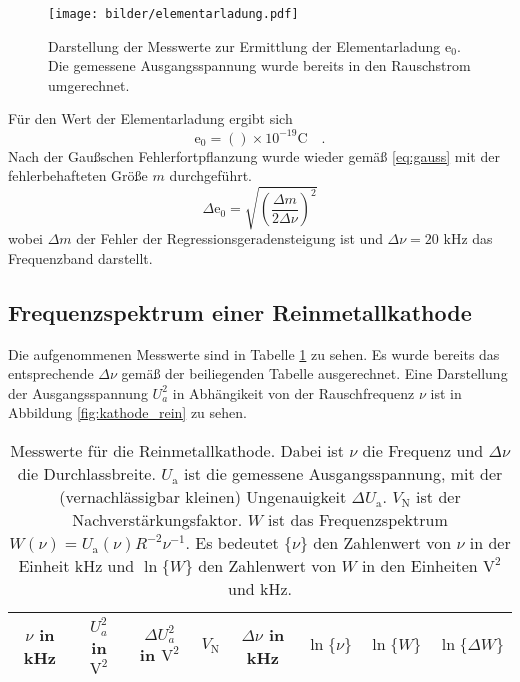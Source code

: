 	\begin{figure}
		\centering
		\texttt{[image: bilder/elementarladung.pdf]}
		\caption{Darstellung der Messwerte zur Ermittlung der
		Elementarladung $\text{e}_0$. Die gemessene Ausgangsspannung
		wurde bereits in den Rauschstrom umgerechnet.}
		\label{fig:elementarladung}
	\end{figure}

	Für den Wert der Elementarladung ergibt sich
	\begin{equation}
	\text{e}_0 = () \times
				10^{-19}\text{C} \quad .
	\end{equation}
	Nach der Gaußschen Fehlerfortpflanzung wurde wieder gemäß \eqref{eq:gauss} mit der
	fehlerbehafteten Größe $m$ durchgeführt.
	\begin{equation}
	\Delta \text{e}_0 = \sqrt{\left( \frac{\Delta m}{2 \Delta \nu} \right)^2}
	\end{equation}
	wobei $\Delta m$ der Fehler der Regressionsgeradensteigung ist und
	$\Delta \nu=20\text{ kHz}$ das Frequenzband darstellt.

\clearpage
\subsection{Frequenzspektrum einer Reinmetallkathode}

	Die aufgenommenen Messwerte sind in Tabelle
	\ref{tab:kathode_rein} zu sehen. Es wurde bereits das
	entsprechende $\Delta \nu$ gemäß der beiliegenden Tabelle
	ausgerechnet. Eine Darstellung der Ausgangsspannung $U_a^2$ in
	Abhängikeit von der Rauschfrequenz $\nu$ ist in Abbildung
	\ref{fig:kathode_rein} zu sehen.
	\begin{table}[h]
		\centering
		\begin{tabular}{cccccccc}
		\toprule \midrule
		$\nu$ in kHz	 & $U_a^2$ in $\text{V}^2$	& $\Delta U_a^2$ in $\text{V}^2$ &
		$V_\text{N}$	 & $\Delta \nu$ in kHz 		& $\ln \{\nu\}$				     &
		$\ln \{W\}$	 & $\ln \{\Delta W\} $ \\
		\midrule
		
		\midrule
		\bottomrule
		\end{tabular}
		\caption{Messwerte für
		die Reinmetallkathode. Dabei ist $\nu$ die Frequenz und $\Delta \nu$ die
		Durchlassbreite. $U_\text{a}$ ist die gemessene Ausgangsspannung, mit der
		(vernachlässigbar kleinen) Ungenauigkeit $\Delta U_\text{a}$. $V_\text{N}$
		ist der Nachverstärkungsfaktor. $W$ ist das Frequenzspektrum
		$W(\nu)=U_\text{a}(\nu) R^{-2} \nu^{-1}$. Es bedeutet $\{\nu \}$ den
		Zahlenwert von $\nu$ in der Einheit kHz und $\ln\{W\}$ den Zahlenwert
		von $W$ in den Einheiten $\text{V}^2$ und kHz.}
		\label{tab:kathode_rein}
	\end{table}

